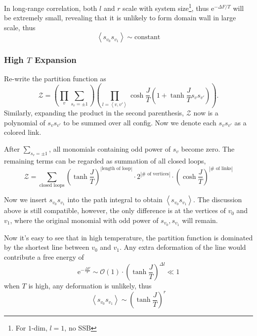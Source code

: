 In long-range correlation, both $l$ and $r$ scale with system size\footnote{
  For $1$-dim, $l=1$, no SSB
}, thus $\mathrm{e}^{- \Delta F / T}$ will be extremely small, revealing that it is unlikely to form domain wall in large scale, thus
\begin{equation}
  \left< s_{v_0} s_{v_1} \right> \sim  \text{constant}
\end{equation}

\subsubsection{High $T$ Expansion}
Re-write the partition function as
\begin{equation}
  \mathcal{Z} = \left( \prod_{v} \sum_{s_{v}=\pm 1}  \right)\left( \prod_{l = \left< v,v' \right>} \cosh \frac{J}{T} \left( 1+ \tanh \frac{J}{T} s_v s_{v'} \right) \right).
\end{equation}
Similarly, expanding the product in the second parenthesis, $\mathcal{Z}$ now is a polynomial of $s_v s_{v'}$ to be summed over all config. Now we denote each $s_{v} s_{v'}$ as a colored link.

After $\sum_{s_v =\pm 1} $, all monomials containing odd power of $s_v$ become zero. The remaining terms can be regarded as summation of all closed loops,
\begin{equation}
  \mathcal{Z} = \sum_{\text{closed loops}}  \left( \tanh \frac{J}{T} \right)^{\left| \text{length of loop} \right|} \cdot 2^{\left| \# \text{ of vertices} \right|} \cdot \left( \cosh \frac{J}{T} \right) ^{\left| \# \text{ of links} \right|}
\end{equation}

Now we insert $s_{v_0} s_{v_1}$ into the path integral to obtain $\left< s_{v_0} s_{v_1} \right>$. The discussion above is still compatible, however, the only difference is at the vertices of $v_0$ and $v_1$, where the original monomial with odd power of $s_{v_0}, s_{v_1}$ will remain. 

Now it's easy to see that in high temperature, the partition function is dominated by the shortest line between $v_0$ and $v_1$. Any extra deformation of the line would contribute a free energy of
\begin{equation}
  \mathrm{e}^{- \frac{\Delta F}{T}} \sim \mathcal{O}(1) \cdot \left( \tanh \frac{J}{T} \right)^{\Delta l} \ll  1
\end{equation}
when $T$ is high, any deformation is unlikely, thus
\begin{equation}
  \left< s_{v_0} s_{v_1} \right> \sim \left( \tanh \frac{J}{T} \right)^{r}
\end{equation}
